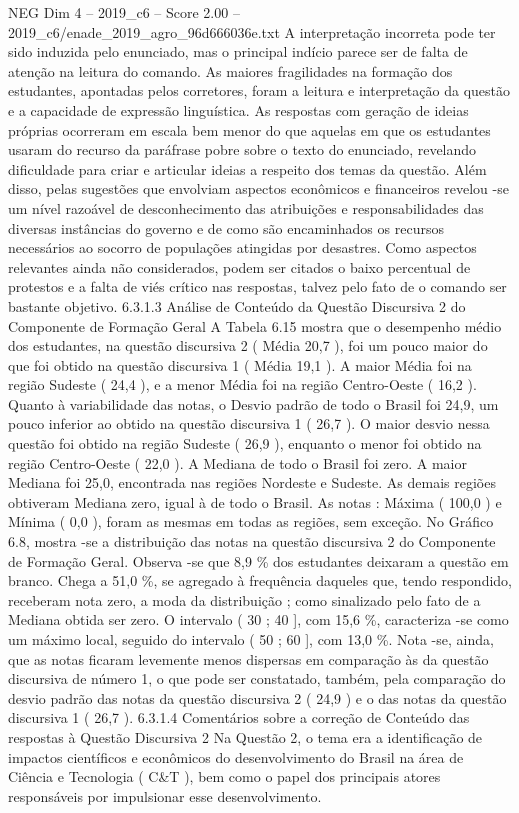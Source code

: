\begin{textsample}{NEG Dim 4 – 2019\_c6 – Score 2.00 – 2019\_c6/enade\_2019\_agro\_96d666036e.txt}
A interpretação incorreta pode ter sido induzida pelo enunciado, mas o principal indício parece ser de falta de atenção na leitura do comando.
As maiores fragilidades na formação dos estudantes, apontadas pelos corretores, foram a leitura e interpretação da questão e a capacidade de expressão linguística.
As respostas com geração de ideias próprias ocorreram em escala bem menor do que aquelas em que os estudantes usaram do recurso da paráfrase pobre sobre o texto do enunciado, revelando dificuldade para criar e articular ideias a respeito dos temas da questão.
Além disso, pelas sugestões que envolviam aspectos econômicos e financeiros revelou -se um nível razoável de desconhecimento das atribuições e responsabilidades das diversas instâncias do governo e de como são encaminhados os recursos necessários ao socorro de populações atingidas por desastres.
Como aspectos relevantes ainda não considerados, podem ser citados o baixo percentual de protestos e a falta de viés crítico nas respostas, talvez pelo fato de o comando ser bastante objetivo. 6.3.1.3 Análise de Conteúdo da Questão Discursiva 2 do Componente de Formação Geral A Tabela 6.15 mostra que o desempenho médio dos estudantes, na questão discursiva 2 ( Média 20,7 ), foi um pouco maior do que foi obtido na questão discursiva 1 ( Média 19,1 ).
A maior Média foi na região Sudeste ( 24,4 ), e a menor Média foi na região Centro-Oeste ( 16,2 ).
Quanto à variabilidade das notas, o Desvio padrão de todo o Brasil foi 24,9, um pouco inferior ao obtido na questão discursiva 1 ( 26,7 ).
O maior desvio nessa questão foi obtido na região Sudeste ( 26,9 ), enquanto o menor foi obtido na região Centro-Oeste ( 22,0 ).
A Mediana de todo o Brasil foi zero.
A maior Mediana foi 25,0, encontrada nas regiões Nordeste e Sudeste.
As demais regiões obtiveram Mediana zero, igual à de todo o Brasil.
As notas : Máxima ( 100,0 ) e Mínima ( 0,0 ), foram as mesmas em todas as regiões, sem exceção.
No Gráfico 6.8, mostra -se a distribuição das notas na questão discursiva 2 do Componente de Formação Geral.
Observa -se que 8,9 \% dos estudantes deixaram a questão em branco.
Chega a 51,0 \%, se agregado à frequência daqueles que, tendo respondido, receberam nota zero, a moda da distribuição ; como sinalizado pelo fato de a Mediana obtida ser zero.
O intervalo ( 30 ; 40 ], com 15,6 \%, caracteriza -se como um máximo local, seguido do intervalo ( 50 ; 60 ], com 13,0 \%.
Nota -se, ainda, que as notas ficaram levemente menos dispersas em comparação às da questão discursiva de número 1, o que pode ser constatado, também, pela comparação do desvio padrão das notas da questão discursiva 2 ( 24,9 ) e o das notas da questão discursiva 1 ( 26,7 ). 6.3.1.4 Comentários sobre a correção de Conteúdo das respostas à Questão Discursiva 2 Na Questão 2, o tema era a identificação de impactos científicos e econômicos do desenvolvimento do Brasil na área de Ciência e Tecnologia ( C\&T ), bem como o papel dos principais atores responsáveis por impulsionar esse desenvolvimento.

\end{textsample}
